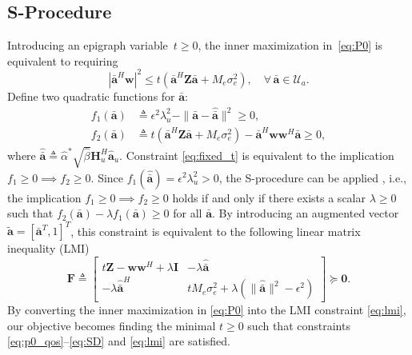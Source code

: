 \documentclass[journal]{IEEEtran}
\begin{document}
\subsection{S-Procedure}
Introducing an epigraph variable~$t\ge 0$, the inner maximization in~\eqref{eq:P0} is equivalent to requiring
\begin{equation}
|\bar{\mathbf{a}}^H\mathbf{w}|^2 \leq t\!\left(\bar{\mathbf{a}}^H\mathbf{Z}\bar{\mathbf{a}}+M_e\sigma_e^2\right), \quad \forall\,\bar{\mathbf{a}}\in\mathcal{U}_a.
\label{eq:fixed_t}
\end{equation}
Define two quadratic functions for $\bar{\mathbf{a}}$:
\begin{subequations}\label{eq:f1 f2}\begin{align}
f_1(\bar{\mathbf{a}})&\triangleq\epsilon^2\lambda_u^2-\|\bar{\mathbf{a}}-\hat{\bar{\mathbf{a}}}\|^2 \geq 0, \label{eq:f1}\\
f_2(\bar{\mathbf{a}})&\triangleq t\!\left(\bar{\mathbf{a}}^H\mathbf{Z}\bar{\mathbf{a}}+M_e\sigma_e^2\right)-\bar{\mathbf{a}}^H\mathbf{w}\mathbf{w}^H\bar{\mathbf{a}} \geq 0, \label{eq:f2}
\end{align}\end{subequations}
where $\hat{\bar{\mathbf{a}}}\triangleq \hat{\alpha}^*\sqrt{\hat{\beta}} \mathbf{H}_u^H \hat{\mathbf{a}}_u$. Constraint \eqref{eq:fixed_t} is equivalent to the implication $f_1 \ge 0 \implies f_2 \ge 0$. Since $f_1(\hat{\bar{\mathbf{a}}}) = \epsilon^2\lambda_u^2 > 0$, the S-procedure can be applied \cite{boyd2004convex}, i.e., the implication $f_1 \ge 0 \implies f_2 \ge 0$ holds if and only if there exists a scalar $\lambda \ge 0$ such that $f_2(\bar{\mathbf{a}}) - \lambda f_1(\bar{\mathbf{a}}) \ge 0$ for all $\bar{\mathbf{a}}$. By introducing an augmented vector $\tilde{\mathbf{a}}=[\bar{\mathbf{a}}^T,1]^T$, this constraint is equivalent to the following linear matrix inequality (LMI)
\begin{equation}
\mathbf{F}\!\triangleq\!\begin{bmatrix}
t\mathbf{Z}\!-\!\mathbf{w}\mathbf{w}^H\!+\!\lambda\mathbf{I} & -\lambda\hat{\bar{\mathbf{a}}}\\
-\lambda\hat{\bar{\mathbf{a}}}^H & tM_e\sigma_e^2+\lambda(\|\hat{\bar{\mathbf{a}}}\|^2\!-\!\epsilon^2)
\end{bmatrix}\!\succeq \mathbf{0}.
\label{eq:lmi}
\end{equation}
By converting the inner maximization in \eqref{eq:P0} into the LMI constraint \eqref{eq:lmi}, our objective becomes finding the minimal $t\ge 0$ such that constraints \eqref{eq:p0_qos}–\eqref{eq:SD} and \eqref{eq:lmi} are satisfied.
\end{document}
